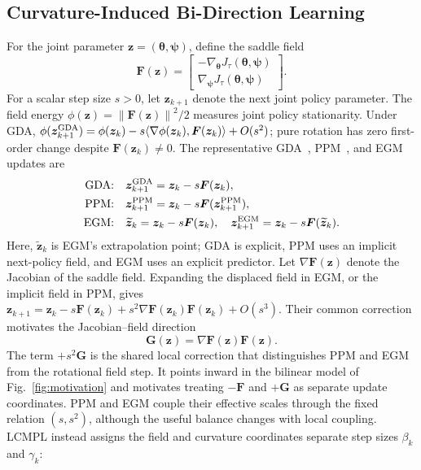 \documentclass[conference]{IEEEtran}
\newcommand{\bF}{\bm{F}}
\newcommand{\bG}{\bm{G}}
\newcommand{\bz}{\bm{z}}
\newcommand{\btheta}{\bm{\theta}}
\newcommand{\bpsi}{\bm{\psi}}
\newcommand{\norm}[1]{\left\lVert #1\right\rVert}
\begin{document}
\subsection{Curvature-Induced Bi-Direction Learning}
For the joint parameter $\bz=(\btheta,\bpsi)$, define the saddle field
\begin{equation}
\bF(\bz)=
\begin{bmatrix}
-\nabla_{\btheta}J_\tau(\btheta,\bpsi)\\
\nabla_{\bpsi}J_\tau(\btheta,\bpsi)
\end{bmatrix}.
\label{eq:field}
\end{equation}
For a scalar step size $s>0$, let $\bz_{k+1}$ denote the next joint policy parameter.
The field energy $\phi(\bz)=\norm{\bF(\bz)}^2/2$ measures joint policy stationarity.
Under GDA, $\phi(\bz_{k+1}^{\rm GDA})=\phi(\bz_k)-s\langle\nabla\phi(\bz_k),\bF(\bz_k)\rangle+O(s^2)$; pure rotation has zero first-order change despite $\bF(\bz_k)\neq0$.
The representative GDA~\cite{Mokhtari2020UnifiedEG}, PPM~\cite{Rockafellar1976PPM}, and EGM~\cite{Korpelevich1976Extragradient} updates are
\[
\begin{aligned}
\textnormal{GDA:}\quad &\bz_{k+1}^{\rm GDA}=\bz_k-s\bF(\bz_k),\\
\textnormal{PPM:}\quad &\bz_{k+1}^{\rm PPM}=\bz_k-s\bF(\bz_{k+1}^{\rm PPM}),\\
\textnormal{EGM:}\quad &\widetilde{\bz}_k=\bz_k-s\bF(\bz_k),\quad
\bz_{k+1}^{\rm EGM}=\bz_k-s\bF(\widetilde{\bz}_k).
\end{aligned}
\]
Here, $\widetilde{\bz}_k$ is EGM's extrapolation point; GDA is explicit, PPM uses an implicit next-policy field, and EGM uses an explicit predictor.
Let $\nabla\bF(\bz)$ denote the Jacobian of the saddle field.
Expanding the displaced field in EGM, or the implicit field in PPM, gives $\bz_{k+1}=\bz_k-s\bF(\bz_k)+s^2\nabla\bF(\bz_k)\bF(\bz_k)+O(s^3)$.
Their common correction motivates the Jacobian--field direction
\begin{equation}
\bG(\bz)=\nabla\bF(\bz)\bF(\bz).
\label{eq:g_direction}
\end{equation}
The term $+s^2\bG$ is the shared local correction that distinguishes PPM and EGM from the rotational field step.
It points inward in the bilinear model of Fig.~\ref{fig:motivation} and motivates treating $-\bF$ and $+\bG$ as separate update coordinates.
PPM and EGM couple their effective scales through the fixed relation $(s,s^2)$, although the useful balance changes with local coupling.
LCMPL instead assigns the field and curvature coordinates separate step sizes $\beta_k$ and $\gamma_k$:
\end{document}
